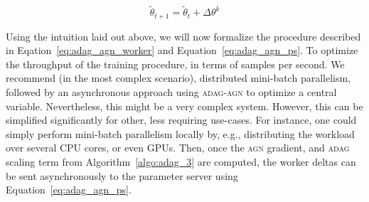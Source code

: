 \begin{equation}
  \label{eq:adag_agn_ps}
  \tilde{\theta}_{t+1} = \tilde{\theta}_t + \Delta\theta^k
\end{equation}

Using the intuition laid out above, we will now formalize the procedure described in Eqation~\ref{eq:adag_agn_worker} and Equation~\ref{eq:adag_agn_ps}. To optimize the throughput of the training procedure, in terms of samples per second. We recommend (in the most complex scenario), distributed mini-batch parallelism, followed by an asynchronous approach using \textsc{adag-agn} to optimize a central variable. Nevertheless, this might be a very complex system. However, this can be simplified significantly for other, less requiring use-cases. For instance, one could simply perform mini-batch parallelism locally by, e.g., distributing the workload over several CPU cores, or even GPUs. Then, once the \textsc{agn} gradient, and \textsc{adag} scaling term from Algorithm~\ref{algo:adag_3} are computed, the worker deltas can be sent asynchronously to the parameter server using Equation~\ref{eq:adag_agn_ps}.
